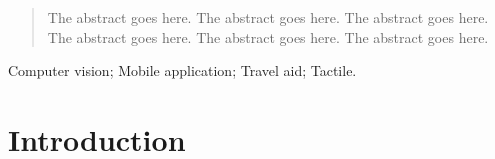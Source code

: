\documentclass[10pt,conference,compsocconf]{IEEEtran}
\begin{document}




\maketitle


\begin{abstract}
The abstract goes here.
The abstract goes here.
The abstract goes here.
The abstract goes here.
The abstract goes here.
The abstract goes here.
\end{abstract}


\begin{IEEEkeywords}
Computer vision; Mobile application; Travel aid; Tactile. %
\end{IEEEkeywords}



%
\IEEEpeerreviewmaketitle


\section{Introduction}
\label{sec:introduction}
\end{document}
